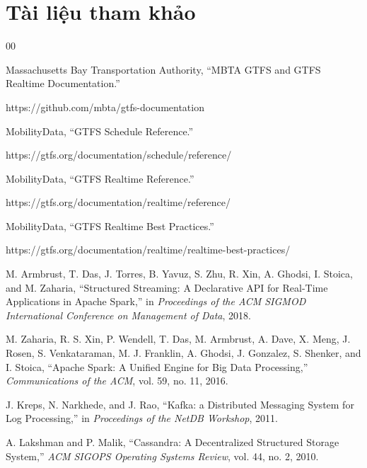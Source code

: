 \section{Tài liệu tham khảo}

\begin{thebibliography}{00}


Massachusetts Bay Transportation Authority,
``MBTA GTFS and GTFS Realtime Documentation.''

https://github.com/mbta/gtfs-documentation


MobilityData,
``GTFS Schedule Reference.''

https://gtfs.org/documentation/schedule/reference/


MobilityData,
``GTFS Realtime Reference.''

https://gtfs.org/documentation/realtime/reference/


MobilityData,
``GTFS Realtime Best Practices.''

https://gtfs.org/documentation/realtime/realtime-best-practices/


M. Armbrust, T. Das, J. Torres, B. Yavuz, S. Zhu, R. Xin, A. Ghodsi, I. Stoica, and M. Zaharia,
``Structured Streaming: A Declarative API for Real-Time Applications in Apache Spark,''
in \textit{Proceedings of the ACM SIGMOD International Conference on Management of Data}, 2018.


M. Zaharia, R. S. Xin, P. Wendell, T. Das, M. Armbrust, A. Dave, X. Meng, J. Rosen, S. Venkataraman,
M. J. Franklin, A. Ghodsi, J. Gonzalez, S. Shenker, and I. Stoica,
``Apache Spark: A Unified Engine for Big Data Processing,''
\textit{Communications of the ACM}, vol. 59, no. 11, 2016.


J. Kreps, N. Narkhede, and J. Rao,
``Kafka: a Distributed Messaging System for Log Processing,''
in \textit{Proceedings of the NetDB Workshop}, 2011.


A. Lakshman and P. Malik,
``Cassandra: A Decentralized Structured Storage System,''
\textit{ACM SIGOPS Operating Systems Review}, vol. 44, no. 2, 2010.


\end{thebibliography}
